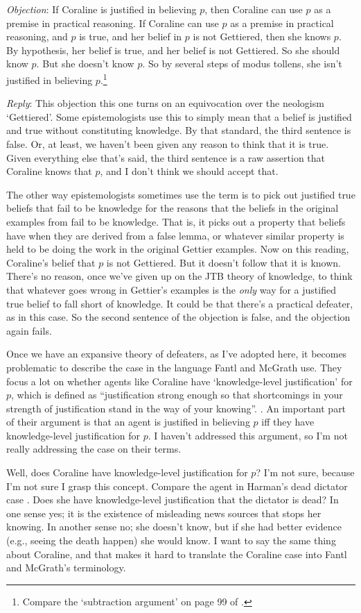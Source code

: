 \textit{Objection}: 
If Coraline is justified in believing $p$, then Coraline can use $p$ as a premise in practical reasoning. If Coraline can use $p$ as a premise in practical reasoning, and $p$ is true, and her belief in $p$ is not Gettiered, then she knows $p$. By hypothesis, her belief is true, and her belief is not Gettiered. So she should know $p$. But she doesn't know $p$. So by several steps of modus tollens, she isn't justified in believing $p$.\footnote{Compare the `subtraction argument' on page 99 of \citet{FantlMcGrath2009}.}

\textit{Reply}: 
This  objection this one turns on an equivocation over the neologism `Gettiered'. Some epistemologists use this to simply mean that a belief is justified and true without constituting knowledge. By that standard, the third sentence is false. Or, at least, we haven't been given any reason to think that it is true. Given everything else that's said, the third sentence is a raw assertion that Coraline knows that $p$, and I don't think we should accept that.

The other way epistemologists sometimes use the term is to pick out justified true beliefs that fail to be knowledge for the reasons that the beliefs in the original examples from \citet{Gettier1963} fail to be knowledge. That is, it picks out a property that beliefs have when they are derived from a false lemma, or whatever similar property is held to be doing the work in the original Gettier examples. Now on this reading, Coraline's belief that $p$ is not Gettiered. But it doesn't follow that it is known. There's no reason, once we've given up on the JTB theory of knowledge, to think that whatever goes wrong in Gettier's examples is the \textit{only} way for a justified true belief to fall short of knowledge. It could be that there's a practical defeater, as in this case. So the second sentence of the objection is false, and the objection again fails.

Once we have an expansive theory of defeaters, as I've adopted here, it becomes problematic to describe the case in the language Fantl and McGrath use. They focus a lot on whether agents like Coraline have `knowledge-level justification' for $p$, which is defined as ``justification strong enough so that shortcomings in your strength of justification stand in the way of your knowing''. \citep[97]{FantlMcGrath2009}. An important part of their argument is that an agent is justified in believing $p$ iff they have knowledge-level justification for $p$. I haven't addressed this argument, so I'm not really addressing the case on their terms.

Well, does Coraline have knowledge-level justification for $p$? I'm not sure, because I'm not sure I grasp this concept. Compare the agent in Harman's dead dictator case \citep[75]{Harman1973}. Does she have knowledge-level justification that the dictator is dead? In one sense yes; it is the existence of misleading news sources that stops her knowing. In another sense no; she doesn't know, but if she had better evidence (e.g., seeing the death happen) she would know. I want to say the same thing about Coraline, and that makes it hard to translate the Coraline case into Fantl and McGrath's terminology.
